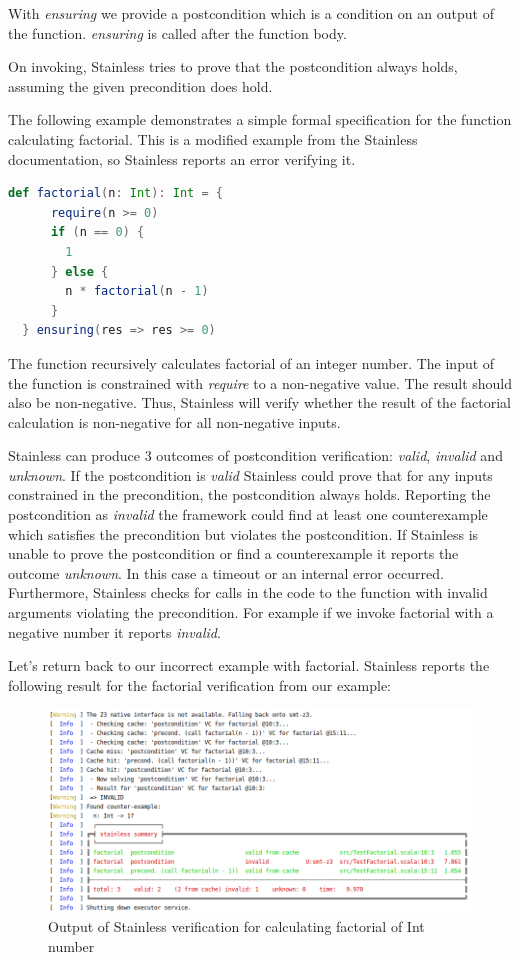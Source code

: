 With \textit{ensuring} we provide a postcondition which is a condition on an output of the function.
\textit{ensuring} is called after the function body.

On invoking, Stainless tries to prove that the postcondition always holds, assuming the given precondition does hold. \cite{Stainless:introduction}

The following example demonstrates a simple formal specification for the function calculating factorial.
This is a modified example from the Stainless documentation, so Stainless reports an error verifying it.
\begin{lstlisting}[language=Scala]
  def factorial(n: Int): Int = {
      require(n >= 0)
      if (n == 0) {
        1
      } else {
        n * factorial(n - 1)
      }
  } ensuring(res => res >= 0)
\end{lstlisting}

The function recursively calculates factorial of an integer number.
The input of the function is constrained with \textit{require} to a non-negative value.
The result should also be non-negative.
Thus, Stainless will verify whether the result of the factorial calculation is non-negative for all non-negative inputs.

Stainless can produce 3 outcomes of postcondition verification: \textit{valid}, \textit{invalid} and \textit{unknown}.
If the postcondition is \textit{valid} Stainless could prove that for any inputs constrained in the precondition, the postcondition always holds.
Reporting the postcondition as \textit{invalid} the framework could find at least one counterexample which satisfies the precondition but violates the postcondition.
If Stainless is unable to prove the postcondition or find a counterexample it reports the outcome \textit{unknown}.
In this case a timeout or an internal error occurred.
Furthermore, Stainless checks for calls in the code to the function with invalid arguments violating the precondition.
For example if we invoke factorial with a negative number it reports \textit{invalid}. \cite{Stainless:introduction}

Let's return back to our incorrect example with factorial.
Stainless reports the following result for the factorial verification from our example:
\begin{figure}[H]
	\centering
		\includegraphics[scale=0.5]{images/output1.png}
	\caption{Output of Stainless verification for calculating factorial of Int number}
	\label{fig:output1}
\end{figure}

